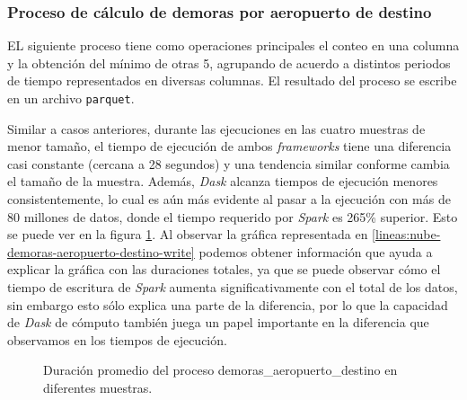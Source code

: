 \subsubsection{Proceso de cálculo de demoras por aeropuerto de destino}

EL siguiente proceso tiene como operaciones principales el conteo en una columna y la obtención del mínimo de otras 5, agrupando de acuerdo a distintos periodos de tiempo representados en diversas columnas. El resultado del proceso se escribe en un archivo \texttt{parquet}.

Similar a casos anteriores, durante las ejecuciones en las cuatro muestras de menor tamaño, el tiempo de ejecución de ambos \textit{frameworks} tiene una diferencia casi constante (cercana a 28 segundos) y una tendencia similar conforme cambia el tamaño de la muestra. Además, \textit{Dask} alcanza tiempos de ejecución menores consistentemente, lo cual es aún más evidente al pasar a la ejecución con más de 80 millones de datos, donde el tiempo requerido por \textit{Spark} es 265\% superior. Esto se puede ver en la figura \ref{lineas:nube-demoras-aeropuerto-destino}. Al observar la gráfica representada en \ref{lineas:nube-demoras-aeropuerto-destino-write} podemos obtener información que ayuda a explicar la gráfica con las duraciones totales, ya que se puede observar cómo el tiempo de escritura de \textit{Spark} aumenta significativamente con el total de los datos, sin embargo esto sólo explica una parte de la diferencia, por lo que la capacidad de \textit{Dask} de cómputo también juega un papel importante en la diferencia que observamos en los tiempos de ejecución.

\begin{figure}
\centering
{}
\caption{Duración promedio del proceso demoras\_aeropuerto\_destino en diferentes muestras.}
\label{lineas:nube-demoras-aeropuerto-destino}
\end{figure}

